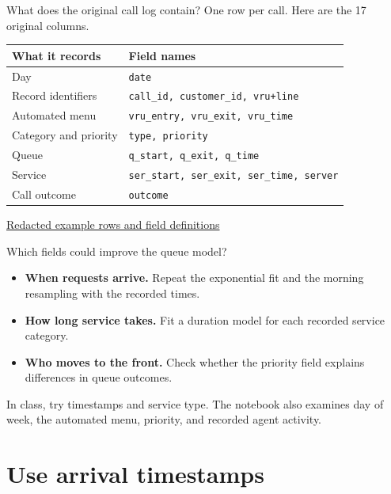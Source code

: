 \documentclass{beamer}
\begin{document}
\begin{frame}{What does the original call log contain?}
  \small
  One row per call. Here are the 17 original columns.

  \vspace{0.65em}
  \begin{tabular}{@{}ll@{}}
    \toprule
    What it records & Field names\\
    \midrule
    Day & \texttt{date}\\
    Record identifiers & \texttt{call\_id, customer\_id, vru+line}\\
    Automated menu & \texttt{vru\_entry, vru\_exit, vru\_time}\\
    Category and priority & \texttt{type, priority}\\
    Queue & \texttt{q\_start, q\_exit, q\_time}\\
    Service & \texttt{ser\_start, ser\_exit, ser\_time, server}\\
    Call outcome & \texttt{outcome}\\
    \bottomrule
  \end{tabular}

  \vspace{0.65em}
  \href{https://github.com/NaitsabesMue/stochastic-modeling-simulation-ds/blob/main/data/anonymousbank_data_guide.md}{Redacted example rows and field definitions}
\end{frame}

\begin{frame}{Which fields could improve the queue model?}
  \begin{itemize}
    \item \textbf{When requests arrive.} Repeat the exponential fit and
      the morning resampling with the recorded times.
    \item \textbf{How long service takes.} Fit a duration model for each
      recorded service category.
    \item \textbf{Who moves to the front.} Check whether the priority
      field explains differences in queue outcomes.
  \end{itemize}

  In class, try timestamps and service type. The notebook also examines
  day of week, the automated menu, priority, and recorded agent activity.
\end{frame}

\section{Use arrival timestamps}
\end{document}
